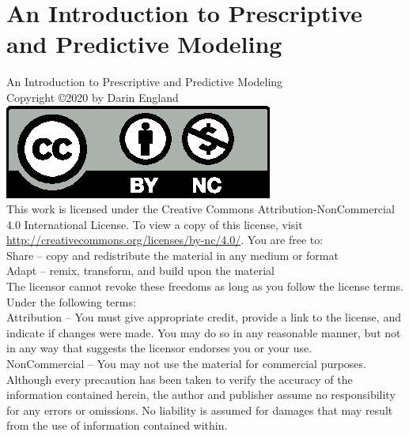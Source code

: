 \documentclass[11pt]{report}
\begin{document}
\chapter*{\Huge \center An Introduction to Prescriptive
  and Predictive Modeling}
\thispagestyle{empty}

\newpage
\noindent
An Introduction to Prescriptive and Predictive Modeling\\
Copyright \copyright 2020 by Darin England\\
\includegraphics[scale=0.8]{by-nc.eps}\\
This work is licensed under the Creative Commons Attribution-NonCommercial 4.0
International License. To view a copy of this license,
visit \url{http://creativecommons.org/licenses/by-nc/4.0/}.
You are free to:\\
Share – copy and redistribute the material in any medium or format\\
Adapt – remix, transform, and build upon the material\\
The licensor cannot revoke these freedoms as long as you follow the license terms.
Under the following terms:\\
Attribution – You must give appropriate credit, provide a link to the license,
and indicate if changes were made. You may do so in any reasonable manner,
but not in any way that suggests the licensor endorses you or your use.\\
NonCommercial – You may not use the material for commercial purposes.\\
Although every precaution has been taken to verify the accuracy of the
information contained herein, the author and publisher assume no
responsibility for any errors or omissions. No liability is assumed
for damages that may result from the use of information contained
within.

\tableofcontents








\printbibliography[heading=bibintoc,title={References}]
\end{document}
